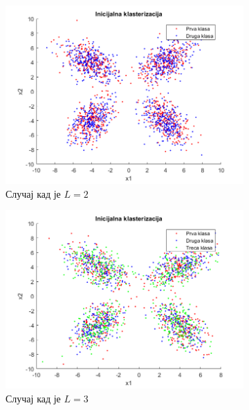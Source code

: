 \begin{figure}[htb!]\caption{Иницијална кластеризација}
\begin{subfigure}{.6\textwidth}
\centering
\includegraphics[width=1\textwidth]{pictures/4/CMean2Init}
\caption{Случај кад је $L=2$}\label{pic:cMean2Init}
\end{subfigure}
\begin{subfigure}{.55\textwidth}
\centering
\includegraphics[width=1\linewidth]{pictures/4/CMean3Init}
\caption{Случај кад је $L=3$}\label{pic:cMean3Init}
\end{subfigure}
\bigskip
\begin{subfigure}{.55\textwidth}
\centering

\end{subfigure}
\end{figure}
